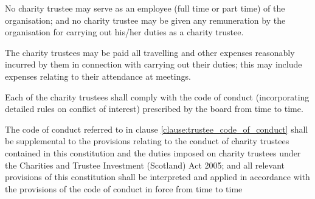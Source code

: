 ﻿\documentclass[a4paper,11pt,onecolumn ]{article}
\begin{document}
\begin{legal}
\item \label{clause:not_employee} No charity trustee may serve as an employee (full time or part time) of the organisation; and no charity trustee may be given any remuneration by the organisation for carrying out his/her duties as a charity trustee. 

\item The charity trustees may be paid all travelling and other expenses reasonably incurred by them in connection with carrying out their duties; this may include expenses relating to their attendance at meetings.
\end{legal}

\begin{legal}
\item \label{clause:trustee_code_of_conduct} Each of the charity trustees shall comply with the code of conduct (incorporating detailed rules on conflict of interest) prescribed by the board from time to time.

\item The code of conduct referred to in clause \ref{clause:trustee_code_of_conduct} shall be supplemental to the provisions relating to the conduct of charity trustees contained in this constitution and the duties imposed on charity trustees under the Charities and Trustee Investment (Scotland) Act 2005; and all relevant provisions of this constitution shall be interpreted and applied in accordance with the provisions of the code of conduct in force from time to time
\end{legal}
\end{document}
